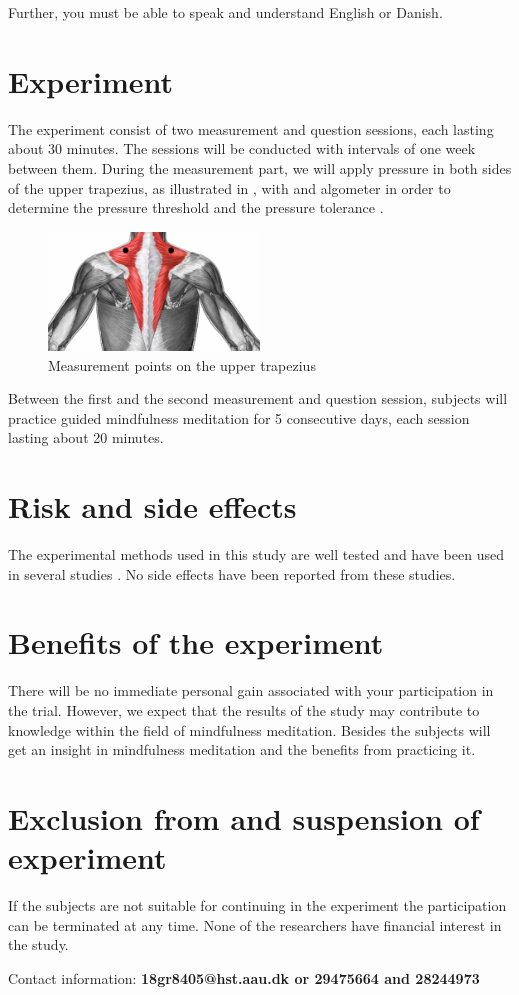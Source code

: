 Further, you must be able to speak and understand English or Danish.
 
\section{Experiment}
The experiment consist of two measurement and question sessions, each lasting about 30 minutes. The sessions will be conducted with intervals of one week between them. During the measurement part, we will apply pressure in both sides of the upper trapezius, as illustrated in , with and algometer in order to determine the pressure threshold and the pressure tolerance . 

\begin{figure}[H]
	\includegraphics[width=0.5\textwidth]{figures/trapezius.jpg}
	\caption{Measurement points on the upper trapezius}
	\label{fig:trapezius} 
\end{figure}

Between the first and the second measurement and question session, subjects will practice guided mindfulness meditation for 5 consecutive days, each session lasting about 20 minutes. 

\section{Risk and side effects}
The experimental methods used in this study are well tested and have been used in several studies . No side effects have been reported from these studies.

\section{Benefits of the experiment}
There will be no immediate personal gain associated with your participation in the trial. However, we expect that the results of the study may contribute to knowledge within the field of mindfulness meditation. Besides the subjects will get an insight in mindfulness meditation and the benefits from practicing it.

\section{Exclusion from and suspension of experiment}
If the subjects are not suitable for continuing in the experiment the participation can be terminated at any time.
None of the researchers have financial interest in the study.

Contact information:
\textbf{18gr8405@hst.aau.dk or 29475664 and 28244973
}